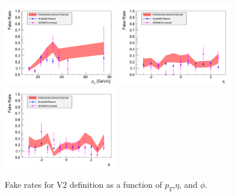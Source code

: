 \begin{figure}[!htbp]
\begin{center}
\includegraphics[width=0.45\textwidth]{figures/ElectronFakeRate_DenominatorV2_ptThreshold30_Pt.pdf}
\includegraphics[width=0.45\textwidth]{figures/ElectronFakeRate_DenominatorV2_ptThreshold30_Eta.pdf}
\includegraphics[width=0.45\textwidth]{figures/ElectronFakeRate_DenominatorV2_ptThreshold30_Phi.pdf}
\caption{Fake rates for V2 definition as a function of $p_T$,$\eta$, and $\phi$.}
\label{fig:ele_fr_V2_jet30}
\end{center}
\end{figure}

